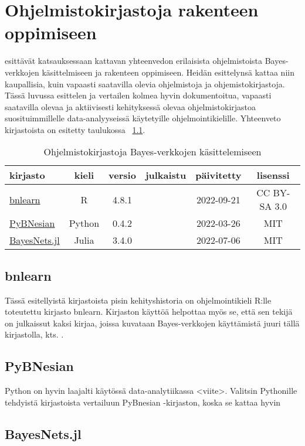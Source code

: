 \chapter{Ohjelmistokirjastoja rakenteen oppimiseen\label{software}}
\citet{scanagatta_survey_2019} esittävät katsauksessaan kattavan yhteenvedon erilaisista ohjelmistoista Bayes-verkkojen käsittelmiseen ja rakenteen oppimiseen. Heidän esittelynsä kattaa niin kaupallisia, kuin vapaasti saatavilla olevia ohjelmistoja ja ohjemistokirjastoja. Tässä luvussa esittelen ja vertailen kolmea hyvin dokumentoitua, vapaasti saatavilla olevaa ja aktiivisesti kehityksessä olevaa ohjelmistokirjastoa suosituimmillelle data-analyyseissä käytetyille ohjelmointikielille. Yhteenveto kirjastoista on esitetty taulukossa ~\ref{table:softat}. \citep{atienza_pybnesian_2022, bayesnetsjl_2021} 

\begin{table}[ht]
\centering
\caption{Ohjelmistokirjastoja Bayes-verkkojen käsittelemiseen\label{table:softat}}
\begin{tabular}{l|| c c c c c} 
kirjasto & kieli & versio & julkaistu & päivitetty & lisenssi \\
\hline \hline 
\href{https://www.bnlearn.com/}{bnlearn} & R & 4.8.1 & & 2022-09-21 & CC BY-SA 3.0 \\
\href{https://github.com/davenza/PyBNesian}{PyBNesian} & Python & 0.4.2 & & 2022-03-26 & MIT \\
\href{https://github.com/sisl/BayesNets.jl}{BayesNets.jl} & Julia & 3.4.0 & & 2022-07-06 & MIT  \\
\hline
\end{tabular}
\end{table}
\section{bnlearn}
Tässä esitellyistä kirjastoista pisin kehityshistoria on ohjelmointikieli R:lle toteutettu kirjasto bnlearn. Kirjaston käyttöä helpottaa myös se, että sen tekijä on julkaissut kaksi kirjaa, joissa kuvataan Bayes-verkkojen käyttämistä juuri tällä kirjastolla, kts. \citep{nagarajan_bayesian_2013, R_bayesian_2014}.

\section{PyBNesian}
Python on hyvin laajalti käytössä data-analytiikassa <viite>. Valitsin Pythonille tehdyistä kirjastoista vertailuun PyBnesian -kirjaston, koska se kattaa hyvin 

\section{BayesNets.jl}


